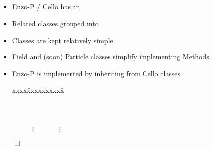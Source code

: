 \NEWSEC

\subsection{\ssDesignSummary}


\begin{frame}[fragile,label=ss-design-summary] 
\secframetitle{\ssDesignSummary}

\begin{itemize}
\item Enzo-P / Cello has an 
\item Related classes grouped into 
\item Classes are kept relatively simple
\item Field and (soon) Particle classes simplify implementing Methods
\item Enzo-P is implemented by inheriting from Cello classes
  \begin{tabbing}
xxxx\=xxxxxxxxxx\=\kill    
\>  \>  \\
\>  \>   \\
\>  \>   \\
\>  \>   \\
\> \ \ \ \ \ \vdots  \> \ \ \ \ \ \vdots 
  \end{tabbing}
\end{itemize}
\vfill
\centerline{$\qed$}
\end{frame}

